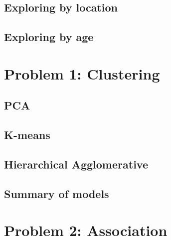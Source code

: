 \hypertarget{exploring-by-location}{%
\subsection{Exploring by location}\label{exploring-by-location}}

\hypertarget{exploring-by-age}{%
\subsection{Exploring by age}\label{exploring-by-age}}

\hypertarget{problem-1-clustering}{%
\section{Problem 1: Clustering}\label{problem-1-clustering}}

\hypertarget{pca}{%
\subsection{PCA}\label{pca}}

\hypertarget{k-means}{%
\subsection{K-means}\label{k-means}}

\hypertarget{hierarchical-agglomerative}{%
\subsection{Hierarchical
Agglomerative}\label{hierarchical-agglomerative}}

\hypertarget{summary-of-models}{%
\subsection{Summary of models}\label{summary-of-models}}

\hypertarget{problem-2-association}{%
\section{Problem 2: Association}\label{problem-2-association}}


\address{%
Imran Aziz\\
\\
\\
}


\address{%
Conrard G. T. Feugmo\\
\\
\\
}


\address{%
Andre Schardong\\
\\
\\
}


\address{%
Milton Segura\\
\\
\\
}


\address{%
Sarpreet Gill\\
York University School of Continuing Studies\\
\\
}


